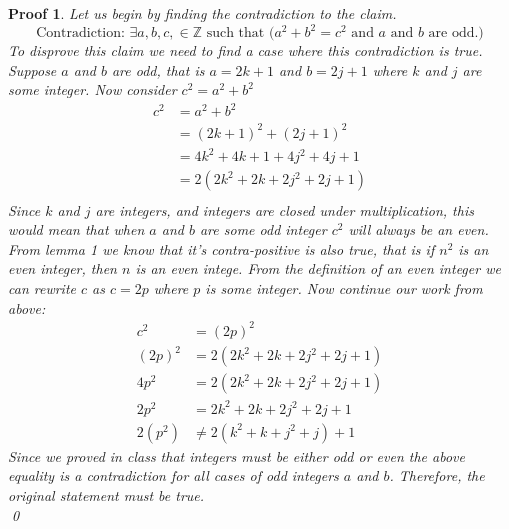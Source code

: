 \documentclass{article}
\newtheorem*{myproof}{Proof}
\begin{document}
\begin{myproof}
    Let us begin by finding the contradiction to the claim.
    $$ \text{Contradiction: }\exists a,b,c, \in \mathbb{Z} \text{ such that } (a^2+b^2=c^2 \text{ and } a \text{ and } b \text{ are odd.)}$$
    To disprove this claim we need to find a case where this contradiction is true. Suppose $a$ and $b$ are odd, that is $a = 2k+1$ and $b = 2j+1$ where $k$ and $j$ are some integer. Now consider $c^2 = a^2+b^2$
    \begin{align*}
        c^2 &= a^2+b^2 \\
        &= (2k+1)^2+(2j+1)^2 \\
        &= 4k^2+4k+1+4j^2+4j+1 \\
        &= 2(2k^2+2k+2j^2+2j+1) \\
    \end{align*}
    Since $k$ and $j$ are integers, and integers are closed under multiplication, this would mean that when $a$ and $b$ are some odd integer $c^2$ will always be an even. From lemma 1 we know that it's contra-positive is also true, that is if $n^2$ is an even integer, then $n$ is an even intege. From the definition of an even integer we can rewrite $c$ as $c = 2p$ where $p$ is some integer. Now continue our work from above:
    \begin{align*}
        c^2 &= (2p)^2 \\
        (2p)^2 &= 2(2k^2+2k+2j^2+2j+1) \\
        4p^2 &= 2(2k^2+2k+2j^2+2j+1) \\ 
        2p^2 &= 2k^2+2k+2j^2+2j+1 \\
        2(p^2) &\neq 2(k^2+k+j^2+j) + 1
    \end{align*}
    Since we proved in class that integers must be either odd or even the above equality is a contradiction for all cases of odd integers $a$ and $b$. Therefore, the original statement must be true.\\
    \qed
\end{myproof}
\newpage
\end{document}
